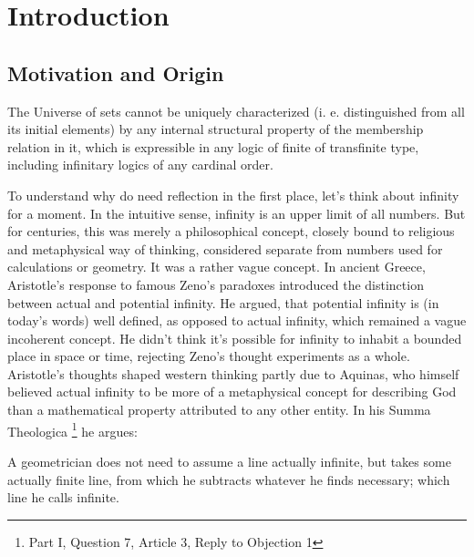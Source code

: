 \documentclass[12pt,a4paper]{article}
\begin{document}
\pagestyle{fancy} %
\renewcommand{\sectionmark}[1]{\markboth{\slshape\thesection.\ #1}{}}


\section{Introduction}\label{sec:vr}

\subsection{Motivation and Origin}
\begin{displayquote}
The Universe of sets cannot be uniquely characterized (i. e. distinguished from all its initial elements) by any internal structural property of the membership relation in it, which is expressible in any logic of finite of transfinite type, including infinitary logics of any cardinal order.
\end{displayquote}

To understand why do need reflection in the first place, let's think about infinity for a moment. In the intuitive sense, infinity is an upper limit of all numbers. But for centuries, this was merely a philosophical concept, closely bound to religious and metaphysical way of thinking, 
considered separate from numbers used for calculations or geometry. It was a rather vague concept. 
In ancient Greece, Aristotle's response to famous Zeno's paradoxes introduced the distinction between actual and potential infinity.
He argued, that potential infinity is (in today's words) well defined, as opposed to actual infinity, which remained a vague incoherent concept. He didn't think it's possible for infinity to inhabit a bounded place in space or time, rejecting Zeno's thought experiments as a whole. 
Aristotle's thoughts shaped western thinking partly due to Aquinas, who himself believed actual infinity to be more of a metaphysical concept for describing God than a mathematical property attributed to any other entity. In his Summa Theologica \footnote{Part I, Question 7, Article 3, Reply to Objection 1} he argues:
\begin{displayquote}
A geometrician does not need to assume a line actually infinite, but takes some actually finite line, from which he subtracts whatever he finds necessary; which line he calls infinite.
\end{displayquote} %
\end{document}
